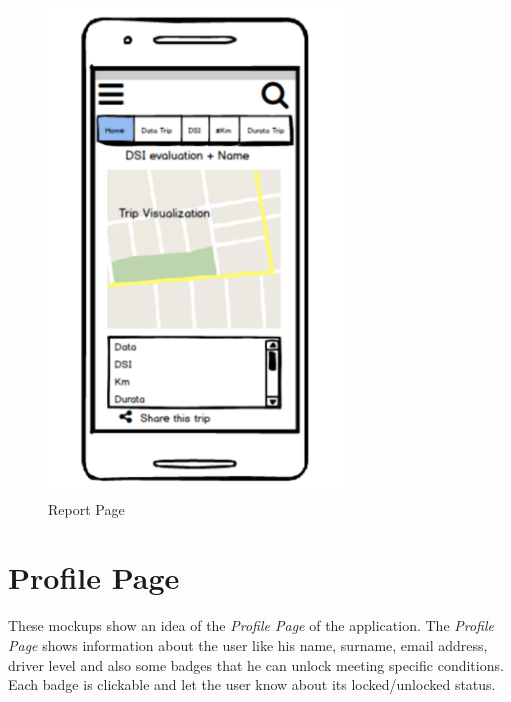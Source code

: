 \begin{figure}[htbp]
\centering
\includegraphics[width=0.7\textwidth]{cpt/img/ReportPage.png}
\caption{Report Page}
\end{figure}

\clearpage
\section{Profile Page}
These mockups show an idea of the \textit{Profile Page} of the application. The \textit{Profile Page} shows information about the user like his name, surname, email address, driver level and also some badges that he can unlock meeting specific conditions. Each badge is clickable and let the user know about its locked/unlocked status.\\

